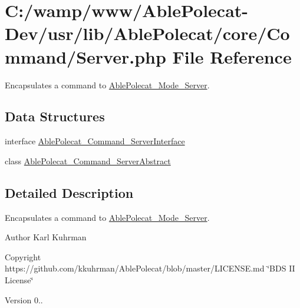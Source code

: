 \hypertarget{_command_2_server_8php}{}\section{C\+:/wamp/www/\+Able\+Polecat-\/\+Dev/usr/lib/\+Able\+Polecat/core/\+Command/\+Server.php File Reference}
\label{_command_2_server_8php}


Encapsulates a command to \hyperlink{class_able_polecat___mode___server}{Able\+Polecat\+\_\+\+Mode\+\_\+\+Server}.  


\subsection*{Data Structures}
\begin{DoxyCompactItemize}
\item 
interface \hyperlink{interface_able_polecat___command___server_interface}{Able\+Polecat\+\_\+\+Command\+\_\+\+Server\+Interface}
\item 
class \hyperlink{class_able_polecat___command___server_abstract}{Able\+Polecat\+\_\+\+Command\+\_\+\+Server\+Abstract}
\end{DoxyCompactItemize}


\subsection{Detailed Description}
Encapsulates a command to \hyperlink{class_able_polecat___mode___server}{Able\+Polecat\+\_\+\+Mode\+\_\+\+Server}. 

\begin{DoxyAuthor}{Author}
Karl Kuhrman 
\end{DoxyAuthor}
\begin{DoxyCopyright}{Copyright}
https\+://github.com/kkuhrman/\+Able\+Polecat/blob/master/\+L\+I\+C\+E\+N\+S\+E.\+md \char`\"{}\+B\+D\+S I\+I License\char`\"{} 
\end{DoxyCopyright}
\begin{DoxyVersion}{Version}
0.. 
\end{DoxyVersion}
